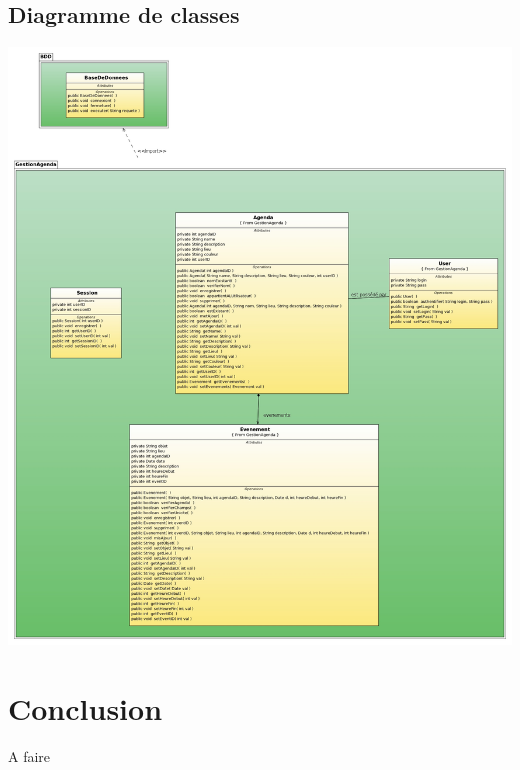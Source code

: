 \documentclass[12pt , a4paper]{article}
\begin{document}
\subsection{Diagramme de classes}
\begin{center}
  \includegraphics[scale=0.3]{./images/class_diagram.jpg}
\end{center}


\newpage	
\section{Conclusion}
A faire
\end{document}
